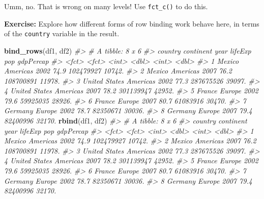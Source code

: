 \documentclass[
]{book}
\newenvironment{Shaded}{\begin{snugshade}}{\end{snugshade}}
\newcommand{\CommentTok}[1]{\textcolor[rgb]{0.56,0.35,0.01}{\textit{#1}}}
\newcommand{\KeywordTok}[1]{\textcolor[rgb]{0.13,0.29,0.53}{\textbf{#1}}}
\newcommand{\NormalTok}[1]{#1}
\newcommand{\OperatorTok}[1]{\textcolor[rgb]{0.81,0.36,0.00}{\textbf{#1}}}
\begin{document}
Umm, no. That is wrong on many levels! Use \texttt{fct\_c()} to do this.

\begin{Shaded}
\end{Shaded}

\textbf{Exercise:} Explore how different forms of row binding work behave here, in terms of the \texttt{country} variable in the result.

\begin{Shaded}
\begin{Highlighting}[]
\KeywordTok{bind_rows}\NormalTok{(df1, df2)}
\CommentTok{#> # A tibble: 8 x 6}
\CommentTok{#>   country       continent  year lifeExp       pop gdpPercap}
\CommentTok{#>   <fct>         <fct>     <int>   <dbl>     <int>     <dbl>}
\CommentTok{#> 1 Mexico        Americas   2002    74.9 102479927    10742.}
\CommentTok{#> 2 Mexico        Americas   2007    76.2 108700891    11978.}
\CommentTok{#> 3 United States Americas   2002    77.3 287675526    39097.}
\CommentTok{#> 4 United States Americas   2007    78.2 301139947    42952.}
\CommentTok{#> 5 France        Europe     2002    79.6  59925035    28926.}
\CommentTok{#> 6 France        Europe     2007    80.7  61083916    30470.}
\CommentTok{#> 7 Germany       Europe     2002    78.7  82350671    30036.}
\CommentTok{#> 8 Germany       Europe     2007    79.4  82400996    32170.}
\KeywordTok{rbind}\NormalTok{(df1, df2)}
\CommentTok{#> # A tibble: 8 x 6}
\CommentTok{#>   country       continent  year lifeExp       pop gdpPercap}
\CommentTok{#>   <fct>         <fct>     <int>   <dbl>     <int>     <dbl>}
\CommentTok{#> 1 Mexico        Americas   2002    74.9 102479927    10742.}
\CommentTok{#> 2 Mexico        Americas   2007    76.2 108700891    11978.}
\CommentTok{#> 3 United States Americas   2002    77.3 287675526    39097.}
\CommentTok{#> 4 United States Americas   2007    78.2 301139947    42952.}
\CommentTok{#> 5 France        Europe     2002    79.6  59925035    28926.}
\CommentTok{#> 6 France        Europe     2007    80.7  61083916    30470.}
\CommentTok{#> 7 Germany       Europe     2002    78.7  82350671    30036.}
\CommentTok{#> 8 Germany       Europe     2007    79.4  82400996    32170.}
\end{Highlighting}
\end{Shaded}
\end{document}
